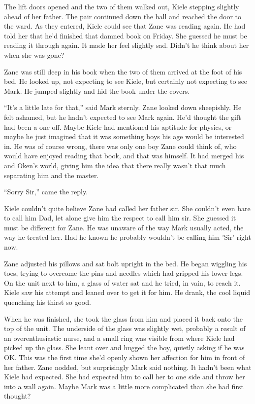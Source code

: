 The lift doors opened and the two of them walked out, Kiele stepping slightly ahead of her father.  The pair continued down the hall and reached the door to the ward.  As they entered, Kiele could see that Zane was reading again.  He had told her that he'd finished that damned book on Friday.  She guessed he must be reading it through again.  It made her feel slightly sad.  Didn't he think about her when she was gone?  

Zane was still deep in his book when the two of them arrived at the foot of his bed.  He looked up, not expecting to see Kiele, but certainly not expecting to see Mark.  He jumped slightly and hid the book under the covers.  

``It's a little late for that,'' said Mark sternly.  Zane looked down sheepishly.  He felt ashamed, but he hadn't expected to see Mark again.  He'd thought the gift had been a one off.  Maybe Kiele had mentioned his aptitude for physics, or maybe he just imagined that it was something boys his age would be interested in.  He was of course wrong, there was only one boy Zane could think of, who would have enjoyed reading that book, and that was himself.  It had merged his and Oken's world, giving him the idea that there really wasn't that much separating him and the master.

``Sorry Sir,'' came the reply.  

Kiele couldn't quite believe Zane had called her father sir.  She couldn't even bare to call him Dad, let alone give him the respect to call him sir.  She guessed it must be different for Zane.  He was unaware of the way Mark usually acted, the way he treated her.  Had he known he probably wouldn't be calling him 'Sir' right now.

Zane adjusted his pillows and sat bolt upright in the bed.  He began wiggling his toes, trying to overcome the pins and needles which had gripped his lower legs.  On the unit next to him, a glass of water sat and he tried, in vain, to reach it.  Kiele saw his attempt and leaned over to get it for him.  He drank, the cool liquid quenching his thirst so good.  

When he was finished, she took the glass from him and placed it back onto the top of the unit.  The underside of the glass was slightly wet, probably a result of an overenthusiastic nurse, and a small ring was visible from where Kiele had picked up the glass.  She leant over and hugged the boy, quietly asking if he was OK.  This was the first time she'd openly shown her affection for him in front of her father.  Zane nodded, but surprisingly Mark said nothing.  It hadn't been what Kiele had expected.  She had expected him to call her to one side and throw her into a wall again.  Maybe Mark was a little more complicated than she had first thought?   

